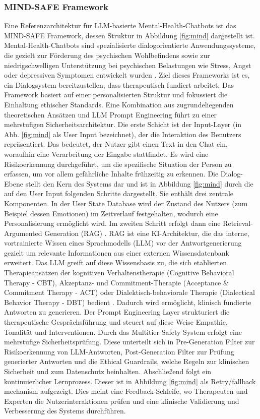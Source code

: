 \subsubsection{MIND-SAFE Framework} 
Eine Referenzarchitektur für LLM-basierte Mental-Health-Chatbots ist das MIND-SAFE Framework, dessen Struktur in Abbildung \ref{fig:mind} dargestellt ist. Mental-Health-Chatbots sind spezialisierte dialogorientierte Anwendungssysteme, die gezielt zur Förderung des psychischen Wohlbefindens sowie zur niedrigschwelligen Unterstützung bei psychischen Belastungen wie Stress, Angst oder depressiven Symptomen entwickelt wurden \citep{boit2025prompt}. Ziel dieses Frameworks ist es, ein Dialogsystem bereitzustellen, dass therapeutisch fundiert arbeitet. Das Framework basiert auf einer personalisierten Struktur und fokussiert die Einhaltung ethischer Standards. Eine Kombination aus zugrundeliegenden theoretischen Ansätzen und LLM Prompt Engineering führt zu einer mehrstufigen Sicherheitsarchitektur. Die erste Schicht ist der Input-Layer (in Abb. \ref{fig:mind} als User Input bezeichnet), der die Interaktion des Benutzers repräsentiert. Das bedeutet, der Nutzer gibt einen Text in den Chat ein, woraufhin eine Verarbeitung der Eingabe stattfindet. Es wird eine Risikoerkennung durchgeführt, um die spezifische Situation der Person zu erfassen, um vor allem gefährliche Inhalte frühzeitig zu erkennen. Die Dialog-Ebene stellt den Kern des Systems dar und ist in Abbildung \ref{fig:mind} durch die auf den User Input folgenden Schritte dargestellt. Sie enthält drei zentrale Komponenten. In der User State Database wird der Zustand des Nutzers (zum Beispiel dessen Emotionen) im Zeitverlauf festgehalten, wodurch eine Personalisierung ermöglicht wird. Im zweiten Schritt erfolgt dann eine Retrieval-Argumented Generation (RAG) \citep{lewis2020retrieval}. 
RAG ist eine KI-Architektur, die das interne, vortrainierte Wissen eines Sprachmodells (LLM) vor der Antwortgenerierung gezielt um relevante Informationen aus einer externen Wissensdatenbank erweitert. Das LLM greift auf diese Wissensbasis zu, die sich etablierten Therapieansätzen der kognitiven Verhaltenstherapie (Cognitive Behavioral Therapy - CBT), Akzeptanz- und Commitment-Therapie (Acceptance \& Commitment Therapy - ACT) oder Dialektisch-behaviorale Therapie (Dialectical Behavior Therapy - DBT) bedient \citep{boit2025prompt}. Dadurch wird ermöglicht, klinisch fundierte Antworten zu generieren. Der Prompt Engineering Layer strukturiert die therapeutische Gesprächsführung und steuert auf diese Weise Empathie, Tonalität und Interventionen. Durch das Multitier Safety System erfolgt eine mehrstufige Sicherheitsprüfung. Diese unterteilt sich in Pre-Generation Filter zur Risikoerkennung von LLM-Antworten, Post-Generation Filter zur Prüfung generierter Antworten und die Ethical Guardrails, welche Regeln zur klinischen Sicherheit und zum Datenschutz beinhalten. Abschließend folgt ein kontinuierlicher Lernprozess. Dieser ist in Abbildung \ref{fig:mind} als Retry/fallback mechanism aufgezeigt. Dies meint eine Feedback-Schleife, wo Therapeuten und Experten die Nutzerinteraktionen prüfen und eine klinische Validierung und Verbesserung des Systems durchführen.

